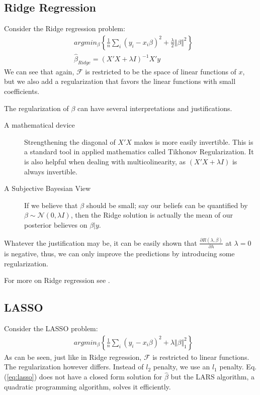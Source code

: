 \documentclass[12pt,a4paper]{article}
\theoremstyle{plain}
\theoremstyle{definition}
\newcommand{\gauss}[1]{\mathcal{N}(#1)}
\newcommand{\norm}[1]{\Vert #1 \Vert}
\newcommand{\risk}{R}
\newcommand{\deriv}[2]{\frac{\partial #1}{\partial #2}}
\newcommand{\argmin}[2]{argmin_{#1}\left\{ #2 \right\}}
\newcommand{\hypclass}{\mathcal{F}}
\begin{document}
\subsection{Ridge Regression}
Consider the Ridge regression problem:
\begin{align}
\label{eq:ridge}
	& \argmin{\beta}{\frac{1}{n}\sum_i (y_i-x_i\beta)^2 + \frac{\lambda}{2}\norm{\beta}^2} \\
	& \hat{\beta}_{Ridge}= (X'X+\lambda I)^{-1} X'y
\end{align}
We can see that again, $\hypclass$ is restricted to be the space of linear functions of $x$, but we also add a regularization that favors the linear functions with small coefficients.

The regularization of $\beta$ can have several interpretations and justifications.
\begin{description}
\item[A mathematical device] Strengthening the diagonal of $X'X$ makes is more easily invertible. This is a standard tool in applied mathematics called Tikhonov Regularization. It is also helpful when dealing with multicolinearity, as $(X'X+\lambda I)$ is always invertible.
\item[A Subjective Bayesian View] If we believe that $\beta$ should be small; say our beliefs can be quantified by $\beta \sim \gauss{0,\lambda I}$, then the Ridge solution is actually the mean of our posterior believes on $\beta|y$.
\end{description}

Whatever the justification may be, it can be easily shown that $\deriv{\risk(\lambda,\beta)}{\lambda}$ at $\lambda=0$ is negative, thus, we can only improve the predictions by introducing some regularization.


For more on Ridge regression see \cite{hastie_elements_2003}.


\subsection{LASSO}
Consider the LASSO problem:
\begin{align}
\label{eq:lasso}
	& \argmin{\beta}{\frac{1}{n}\sum_i (y_i-x_i\beta)^2 + \lambda \norm{\beta}^2_1} 
\end{align}
As can be seen, just like in Ridge regression, $\hypclass$ is restricted to linear functions. The regularization however differs. Instead of $l_2$ penalty, we use an $l_1$ penalty.
Eq.(\ref{eq:lasso}) does not have a closed form solution for $\hat{\beta}$ but the LARS algorithm, a quadratic programming algorithm, solves it efficiently.
\end{document}
